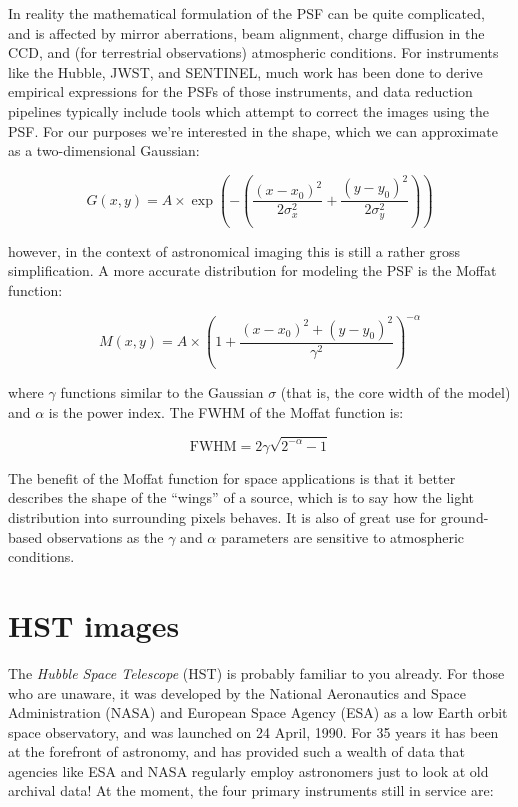 \documentclass{tufte-book}
\begin{document}
In reality the mathematical formulation of the PSF can be quite complicated, and is affected by mirror aberrations, beam alignment, charge diffusion in the CCD, and (for terrestrial observations) atmospheric conditions. For instruments like the Hubble, JWST, and SENTINEL, much work has been done to derive empirical expressions for the PSFs of those instruments, and data reduction pipelines typically include tools which attempt to correct the images using the PSF. For our purposes we're interested in the shape, which we can approximate as a two-dimensional Gaussian:

\begin{equation}
G(x, y) = A \times \exp\left(-\left(\frac{(x-x_0)^2}{2\sigma_x^2} + \frac{(y-y_0)^2}{2\sigma_y^2}\right)\right)
\end{equation}

\noindent however, in the context of astronomical imaging this is still a rather gross simplification. A more accurate distribution for modeling the PSF is the Moffat function:

\begin{equation}
M(x, y) = A \times \left( 1 + \frac{(x-x_0)^2 + (y-y_0)^2}{\gamma^2}\right)^{-\alpha}
\end{equation}

\noindent where $\gamma$ functions similar to the Gaussian $\sigma$ (that is, the core width of the model) and $\alpha$ is the power index. The FWHM of the Moffat function is:

\begin{equation}
\mathrm{FWHM} = 2\gamma \sqrt{2^{-\alpha} - 1}
\end{equation}

The benefit of the Moffat function for space applications is that it better describes the shape of the ``wings'' of a source, which is to say how the light distribution into surrounding pixels behaves. It is also of great use for ground-based observations as the $\gamma$ and $\alpha$ parameters are sensitive to atmospheric conditions.

\section{HST images}

The \textit{Hubble Space Telescope} (HST) is probably familiar to you already. For those who are unaware, it was developed by the National Aeronautics and Space Administration (NASA) and European Space Agency (ESA) as a low Earth orbit space observatory, and was launched on 24 April, 1990. For 35 years it has been at the forefront of astronomy, and has provided such a wealth of data that agencies like ESA and NASA regularly employ astronomers just to look at old archival data! At the moment, the four primary instruments still in service are:
\end{document}
